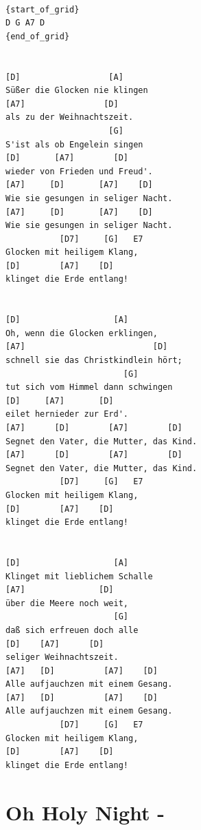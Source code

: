 \documentclass[
]{book}
\let\stdsection\section
\renewcommand\section{\clearpage\stdsection}
\begin{document}
\begin{verbatim}

{start_of_grid}
D G A7 D 
{end_of_grid}


[D]                  [A]
Süßer die Glocken nie klingen
[A7]                [D]
als zu der Weihnachtszeit.
                     [G]
S'ist als ob Engelein singen
[D]       [A7]        [D]
wieder von Frieden und Freud'.
[A7]     [D]       [A7]    [D]
Wie sie gesungen in seliger Nacht.
[A7]     [D]       [A7]    [D]
Wie sie gesungen in seliger Nacht.
           [D7]     [G]   E7
Glocken mit heiligem Klang,
[D]        [A7]    [D]
klinget die Erde entlang!

 
[D]                   [A]
Oh, wenn die Glocken erklingen,
[A7]                          [D]
schnell sie das Christkindlein hört;
                        [G]
tut sich vom Himmel dann schwingen
[D]     [A7]       [D]
eilet hernieder zur Erd'.
[A7]      [D]        [A7]        [D]
Segnet den Vater, die Mutter, das Kind.
[A7]      [D]        [A7]        [D]
Segnet den Vater, die Mutter, das Kind.
           [D7]     [G]   E7
Glocken mit heiligem Klang,
[D]        [A7]    [D]
klinget die Erde entlang!


[D]                   [A]
Klinget mit lieblichem Schalle
[A7]               [D]
über die Meere noch weit,
                      [G]
daß sich erfreuen doch alle
[D]    [A7]      [D]
seliger Weihnachtszeit.
[A7]   [D]          [A7]    [D]
Alle aufjauchzen mit einem Gesang.
[A7]   [D]          [A7]    [D]
Alle aufjauchzen mit einem Gesang.
           [D7]     [G]   E7
Glocken mit heiligem Klang,
[D]        [A7]    [D]
klinget die Erde entlang!
\end{verbatim}

\hypertarget{oh-holy-night--}{%
\section{Oh Holy Night -}\label{oh-holy-night--}}
\end{document}
